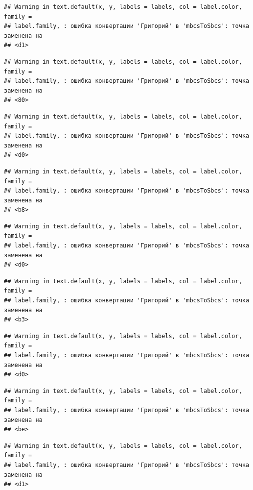 \documentclass[]{book}
\begin{document}
\begin{verbatim}
## Warning in text.default(x, y, labels = labels, col = label.color, family =
## label.family, : ошибка конвертации 'Григорий' в 'mbcsToSbcs': точка заменена на
## <d1>
\end{verbatim}

\begin{verbatim}
## Warning in text.default(x, y, labels = labels, col = label.color, family =
## label.family, : ошибка конвертации 'Григорий' в 'mbcsToSbcs': точка заменена на
## <80>
\end{verbatim}

\begin{verbatim}
## Warning in text.default(x, y, labels = labels, col = label.color, family =
## label.family, : ошибка конвертации 'Григорий' в 'mbcsToSbcs': точка заменена на
## <d0>
\end{verbatim}

\begin{verbatim}
## Warning in text.default(x, y, labels = labels, col = label.color, family =
## label.family, : ошибка конвертации 'Григорий' в 'mbcsToSbcs': точка заменена на
## <b8>
\end{verbatim}

\begin{verbatim}
## Warning in text.default(x, y, labels = labels, col = label.color, family =
## label.family, : ошибка конвертации 'Григорий' в 'mbcsToSbcs': точка заменена на
## <d0>
\end{verbatim}

\begin{verbatim}
## Warning in text.default(x, y, labels = labels, col = label.color, family =
## label.family, : ошибка конвертации 'Григорий' в 'mbcsToSbcs': точка заменена на
## <b3>
\end{verbatim}

\begin{verbatim}
## Warning in text.default(x, y, labels = labels, col = label.color, family =
## label.family, : ошибка конвертации 'Григорий' в 'mbcsToSbcs': точка заменена на
## <d0>
\end{verbatim}

\begin{verbatim}
## Warning in text.default(x, y, labels = labels, col = label.color, family =
## label.family, : ошибка конвертации 'Григорий' в 'mbcsToSbcs': точка заменена на
## <be>
\end{verbatim}

\begin{verbatim}
## Warning in text.default(x, y, labels = labels, col = label.color, family =
## label.family, : ошибка конвертации 'Григорий' в 'mbcsToSbcs': точка заменена на
## <d1>
\end{verbatim}
\end{document}
